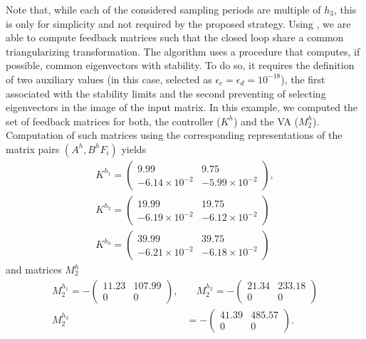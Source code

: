 \documentclass[letterpaper, 10 pt, conference]{ieeeconf}
\begin{document}
Note that, while each of the considered sampling periods are multiple
of $h_3$, this is only for simplicity and not required by the proposed
strategy. Using \cite[Algorithm 1]{haimobras_2010}, we are able to
compute feedback matrices such that the closed loop share a common
triangularizing transformation. The algorithm uses a procedure that
computes, if possible, common eigenvectors with stability. To do so,
it requires the definition of two auxiliary values (in this case,
selected as $\epsilon_c = \epsilon_d = 10^{-18}$), the first
associated with the stability limits and the second preventing of
selecting eigenvectors in the image of the input matrix. In this
example, we computed the set of feedback matrices for both, the
controller ($K^h$) and the VA ($M_2^h$). Computation of such matrices
using the corresponding representations of the matrix pairs
$(A^h,B^hF_i)$ yields
\begin{align}
  K^{h_1} = 
  \left(\begin{smallmatrix}  
    9.99  &  9.75\\
    -6.14\times 10^{-2} &  -5.99\times 10^{-2}
  \end{smallmatrix} \right),\\
 K^{h_2} =\left(
\begin{smallmatrix}
  19.99 &  19.75\\
  -6.19\times 10^{-2} &  -6.12\times 10^{-2}
\end{smallmatrix} \right)\\
K^{h_3} =\left(
\begin{smallmatrix}
  39.99  & 39.75\\
  -6.21\times 10^{-2}  & -6.18\times 10^{-2}
\end{smallmatrix} \right)
\end{align}
and matrices $M_2^{h}$
\begin{align}
M_2^{h_1} =-\left(
\begin{smallmatrix}
   11.23&  107.99\\
         0&         0
\end{smallmatrix} \right),& \quad
M_2^{h_2} =-\left(
\begin{smallmatrix}
   21.34 & 233.18\\
         0 &        0
\end{smallmatrix} \right)\\
M_2^{h_3} &=-\left(
\begin{smallmatrix}
   41.39 &485.57\\
    0& 0\end{smallmatrix} \right).
\end{align}
\end{document}
